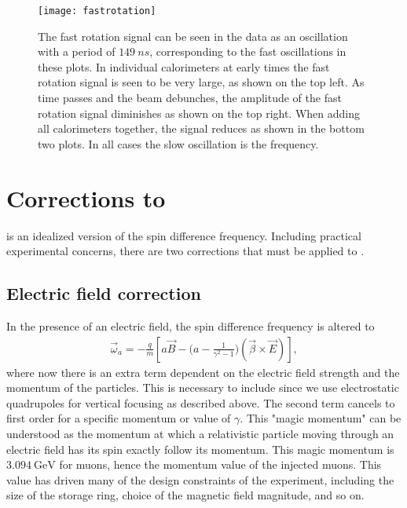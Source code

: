 \begin{figure}[]
    \centering
    \texttt{[image: fastrotation]}
    \caption[Beam debunching fast rotation]{The fast rotation signal can be seen in the data as an oscillation with a period of $\SI{149}{ns}$, corresponding to the fast oscillations in these plots. In individual calorimeters at early times the fast rotation signal is seen to be very large, as shown on the top left. As time passes and the beam debunches, the amplitude of the fast rotation signal diminishes as shown on the top right. When adding all calorimeters together, the signal reduces as shown in the bottom two plots. In all cases the slow oscillation is the \gmtwo frequency.}
    \label{fig:fastrotation}
\end{figure}



\section{Corrections to \texorpdfstring{\wa}{wa}}

 is an idealized version of the spin difference frequency. Including practical experimental concerns, there are two corrections that must be applied to \wa.

\subsection{Electric field correction}

In the presence of an electric field, the spin difference frequency is altered to 
        \begin{align} \label{eq:waelectric}
            \vec{\omega}_{a} = -\frac{q}{m} [a\vec{B} - \Big(a - \frac{1}{\gamma^{2}-1}\Big)(\vec{\beta} \times \vec{E}) ],
        \end{align}
where now there is an extra term dependent on the electric field strength and the momentum of the particles. This is necessary to include since we use electrostatic quadrupoles for vertical focusing as described above. The second term cancels to first order for a specific momentum or value of $\gamma$. This "magic momentum" can be understood as the momentum at which a relativistic particle moving through an electric field has its spin exactly follow its momentum. This magic momentum is $\SI{3.094}{\GeV}$ for muons, hence the momentum value of the injected muons. This value has driven many of the design constraints of the \gmtwo experiment, including the size of the storage ring, choice of the magnetic field magnitude, and so on.

